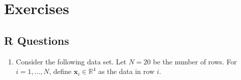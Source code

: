 \documentclass[
  12pt,
  krantz2]{krantz}
\providecommand{\tightlist}{%
  \setlength{\itemsep}{0pt}\setlength{\parskip}{0pt}}
\begin{document}
\hypertarget{exercises-2}{%
\section{Exercises}\label{exercises-2}}

\hypertarget{r-questions-2}{%
\subsection{R Questions}\label{r-questions-2}}

\begin{enumerate}
\def\labelenumi{\arabic{enumi}.}
\tightlist
\item
  Consider the following data set. Let \(N = 20\) be the number of rows. For \(i=1,\ldots,N\), define \(\mathbf{x}_i \in \mathbb{R}^4\) as the data in row \(i\).
\end{enumerate}
\end{document}
